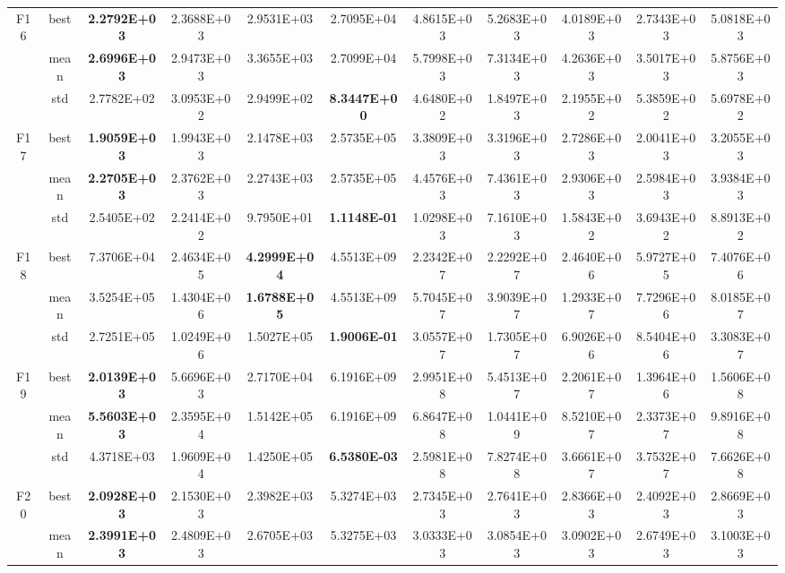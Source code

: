 \documentclass{wzuthesis}
\begin{document}
\begin{longtable}{ccccccccccc}
    \multirow{3}[0]{*}{F16} & best  & \textbf{2.2792E+03} & 2.3688E+03 & 2.9531E+03 & 2.7095E+04 & 4.8615E+03 & 5.2683E+03 & 4.0189E+03 & 2.7343E+03 & 5.0818E+03 \\
          & mean  & \textbf{2.6996E+03} & 2.9473E+03 & 3.3655E+03 & 2.7099E+04 & 5.7998E+03 & 7.3134E+03 & 4.2636E+03 & 3.5017E+03 & 5.8756E+03 \\
          & std   & 2.7782E+02 & 3.0953E+02 & 2.9499E+02 & \textbf{8.3447E+00} & 4.6480E+02 & 1.8497E+03 & 2.1955E+02 & 5.3859E+02 & 5.6978E+02 \\
    \multirow{3}[0]{*}{F17} & best  & \textbf{1.9059E+03} & 1.9943E+03 & 2.1478E+03 & 2.5735E+05 & 3.3809E+03 & 3.3196E+03 & 2.7286E+03 & 2.0041E+03 & 3.2055E+03 \\
          & mean  & \textbf{2.2705E+03} & 2.3762E+03 & 2.2743E+03 & 2.5735E+05 & 4.4576E+03 & 7.4361E+03 & 2.9306E+03 & 2.5984E+03 & 3.9384E+03 \\
          & std   & 2.5405E+02 & 2.2414E+02 & 9.7950E+01 & \textbf{1.1148E-01} & 1.0298E+03 & 7.1610E+03 & 1.5843E+02 & 3.6943E+02 & 8.8913E+02 \\
    \multirow{3}[0]{*}{F18} & best  & 7.3706E+04 & 2.4634E+05 & \textbf{4.2999E+04} & 4.5513E+09 & 2.2342E+07 & 2.2292E+07 & 2.4640E+06 & 5.9727E+05 & 7.4076E+06 \\
          & mean  & 3.5254E+05 & 1.4304E+06 & \textbf{1.6788E+05} & 4.5513E+09 & 5.7045E+07 & 3.9039E+07 & 1.2933E+07 & 7.7296E+06 & 8.0185E+07 \\
          & std   & 2.7251E+05 & 1.0249E+06 & 1.5027E+05 & \textbf{1.9006E-01} & 3.0557E+07 & 1.7305E+07 & 6.9026E+06 & 8.5404E+06 & 3.3083E+07 \\
    \multirow{3}[0]{*}{F19} & best  & \textbf{2.0139E+03} & 5.6696E+03 & 2.7170E+04 & 6.1916E+09 & 2.9951E+08 & 5.4513E+07 & 2.2061E+07 & 1.3964E+06 & 1.5606E+08 \\
          & mean  & \textbf{5.5603E+03} & 2.3595E+04 & 1.5142E+05 & 6.1916E+09 & 6.8647E+08 & 1.0441E+09 & 8.5210E+07 & 2.3373E+07 & 9.8916E+08 \\
          & std   & 4.3718E+03 & 1.9609E+04 & 1.4250E+05 & \textbf{6.5380E-03} & 2.5981E+08 & 7.8274E+08 & 3.6661E+07 & 3.7532E+07 & 7.6626E+08 \\
    \multirow{3}[0]{*}{F20} & best  & \textbf{2.0928E+03} & 2.1530E+03 & 2.3982E+03 & 5.3274E+03 & 2.7345E+03 & 2.7641E+03 & 2.8366E+03 & 2.4092E+03 & 2.8669E+03 \\
          & mean  & \textbf{2.3991E+03} & 2.4809E+03 & 2.6705E+03 & 5.3275E+03 & 3.0333E+03 & 3.0854E+03 & 3.0902E+03 & 2.6749E+03 & 3.1003E+03 \\

\end{longtable}
\end{document}
